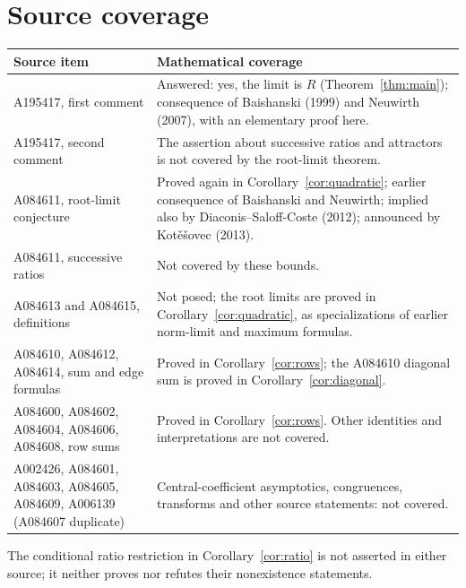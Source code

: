 \documentclass[11pt]{article}
\begin{document}
\section{Source coverage}
\begin{center}
\small
\begin{tabular}{@{}p{.31\linewidth}p{.61\linewidth}@{}}
\toprule
Source item & Mathematical coverage\\
\midrule
A195417, first comment & Answered: yes, the limit is $R$
(Theorem~\ref{thm:main}); consequence of Baishanski (1999) and
Neuwirth (2007), with an elementary proof here.\\[3pt]
A195417, second comment & The assertion about successive ratios and
attractors is not covered by the root-limit theorem.\\[3pt]
A084611, root-limit conjecture & Proved again in Corollary~\ref{cor:quadratic};
earlier consequence of Baishanski and Neuwirth; implied also by
Diaconis--Saloff-Coste (2012); announced by Kot\v{e}\v{s}ovec (2013).\\[3pt]
A084611, successive ratios & Not covered by these bounds.\\
A084613 and A084615, definitions & Not posed; the root limits are proved
in Corollary~\ref{cor:quadratic}, as specializations of earlier
norm-limit and maximum formulas.\\[3pt]
A084610, A084612, A084614, sum and edge formulas & Proved in
Corollary~\ref{cor:rows}; the A084610 diagonal sum is proved in
Corollary~\ref{cor:diagonal}.\\[3pt]
A084600, A084602, A084604, A084606, A084608, row sums & Proved in
Corollary~\ref{cor:rows}. Other identities and interpretations are not covered.\\[3pt]
A002426, A084601, A084603, A084605, A084609, A006139
(A084607 duplicate) & Central-coefficient asymptotics, congruences,
transforms and other source statements: not covered.\\
\bottomrule
\end{tabular}
\end{center}
The conditional ratio restriction in Corollary~\ref{cor:ratio} is not
asserted in either source; it neither proves nor refutes their
nonexistence statements.
\end{document}
